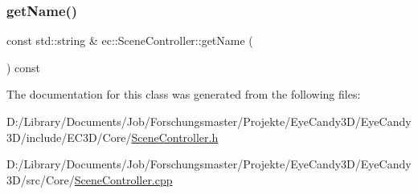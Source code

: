 \subsubsection{\texorpdfstring{get\+Name()}{getName()}}
{\footnotesize\ttfamily const std\+::string \& ec\+::\+Scene\+Controller\+::get\+Name (\begin{DoxyParamCaption}{ }\end{DoxyParamCaption}) const}



The documentation for this class was generated from the following files\+:\begin{DoxyCompactItemize}
\item 
D\+:/\+Library/\+Documents/\+Job/\+Forschungsmaster/\+Projekte/\+Eye\+Candy3\+D/\+Eye\+Candy3\+D/include/\+E\+C3\+D/\+Core/\mbox{\hyperlink{_scene_controller_8h}{Scene\+Controller.\+h}}\item 
D\+:/\+Library/\+Documents/\+Job/\+Forschungsmaster/\+Projekte/\+Eye\+Candy3\+D/\+Eye\+Candy3\+D/src/\+Core/\mbox{\hyperlink{_scene_controller_8cpp}{Scene\+Controller.\+cpp}}\end{DoxyCompactItemize}
